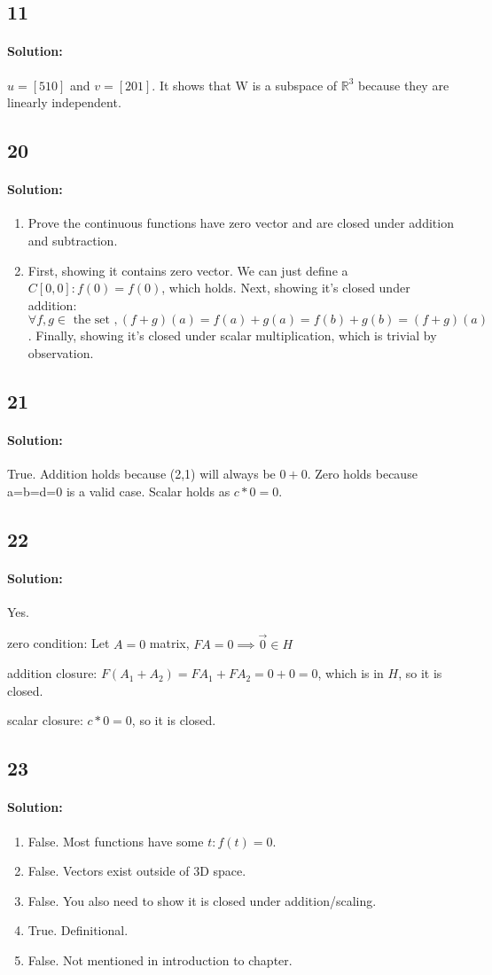 \documentclass[11pt, notitlepage]{report}
\newcommand{\R}{\mathbb{R}}
\newcommand{\ora}[1]{\overrightarrow{#1}}
\newenvironment{solution}{\paragraph{Solution:}}{\hfill}
\begin{document}
\subsection{11}
\begin{solution}
   $u = [5 1 0]$ and $v = [2 0 1]$. It shows that W is a subspace of $\R^3$ because they are linearly independent.
\end{solution}
\subsection{20}
\begin{solution}
\begin{enumerate}[label=\alph*.)]
   \item Prove the continuous functions have zero vector and are closed under addition and subtraction.
   \item First, showing it contains zero vector. We can just define a $C[0,0]:f(0)=f(0)$, which holds. Next, showing it's closed under addition: $\forall f,g\in \text{ the set }, (f+g)(a)=f(a)+g(a)=f(b)+g(b)=(f+g)(a)$. Finally, showing it's closed under scalar multiplication, which is trivial by observation.
\end{enumerate}
\end{solution}
\subsection{21}
\begin{solution}
   True. Addition holds because (2,1) will always be $0+0$. Zero holds because a=b=d=0 is a valid case. Scalar holds as $c*0=0$.
\end{solution}
\subsection{22}
\begin{solution}
   Yes.

   zero condition: Let $A=0$ matrix, $FA=0\implies \ora{0} \in H$

   addition closure: $F(A_1 + A_2)=FA_1 + FA_2 = 0 + 0 = 0$, which is in $H$, so it is closed.

   scalar closure: $c*0=0$, so it is closed.
\end{solution}
\subsection{23}
\begin{solution}
\begin{enumerate}[label=\alph*.)]
   \item False. Most functions have some $t:f(t)=0$.
   \item False. Vectors exist outside of 3D space.
   \item False. You also need to show it is closed under addition/scaling.
   \item True. Definitional.
   \item False. Not mentioned in introduction to chapter.
\end{enumerate}
\end{solution}
\end{document}
